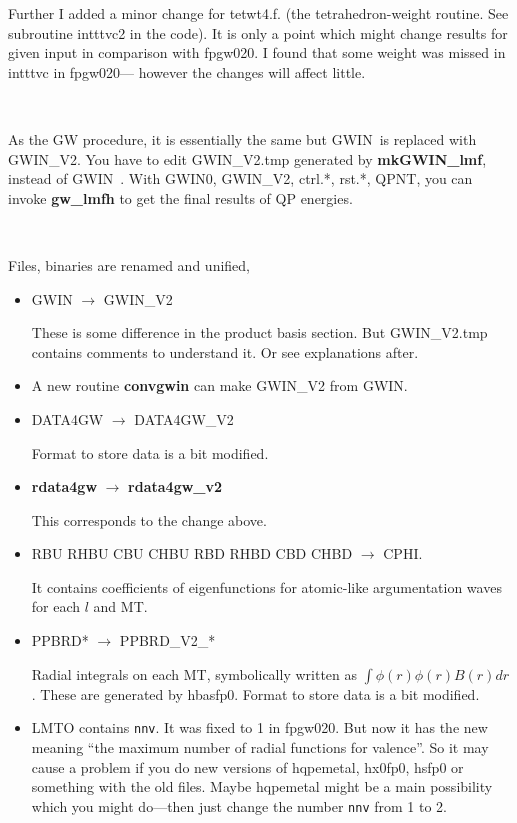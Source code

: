 \documentclass[a4paper,10pt,epsf,fleqn]{article}
\newcommand{\GWIN}{{\sf GWIN}\ }
\newcommand{\exe}[1]{{\bf #1}}
\begin{document}
{{{Further I added a minor change for tetwt4.f.
(the tetrahedron-weight routine. See subroutine intttvc2 in the code).
It is only a point which might change results for given input
in comparison with fpgw020.
I found that some weight was missed in intttvc in fpgw020---
however the changes will affect little.

\ 

As the GW procedure, it is essentially the same
but \GWIN is replaced with {\sf GWIN\_V2}.
You have to edit {\sf GWIN\_V2.tmp} generated by \exe{mkGWIN\_lmf},
instead of \GWIN. With {\sf GWIN0}, {\sf GWIN\_V2},
{\sf ctrl.*}, {\sf rst.*}, {\sf QPNT}, you can invoke \exe{gw\_lmfh}
to get the final results of QP energies.

\ 

Files, binaries are renamed and unified,

\begin{itemize}
\item
  {\sf GWIN} $\rightarrow$ {\sf GWIN\_V2}

  These is some difference in the product basis section.
  But {\sf GWIN\_V2.tmp} contains comments to understand it.
  Or see explanations after.

\item
  A new routine {\bf convgwin} can make {\sf GWIN\_V2}
  from {\sf GWIN}. 

\item
  {\sf DATA4GW} $\rightarrow$ {\sf DATA4GW\_V2}

  Format to store data is a bit modified.
\item
  {\bf rdata4gw} $\rightarrow$ {\bf rdata4gw\_v2}

   This corresponds to the change above.
\item
  {\sf RBU RHBU CBU CHBU RBD RHBD CBD CHBD } $\rightarrow$ {\sf CPHI}.

  It contains coefficients of eigenfunctions for atomic-like argumentation
  waves for each $l$ and MT.

\item
 {\sf PPBRD*} $\rightarrow$ {\sf PPBRD\_V2\_*}

 Radial integrals on each MT, symbolically written as 
  $\int \phi(r) \phi(r) B(r) dr$. 
  These are generated by {\sf hbasfp0}.
  Format to store data is a bit modified.

\item
 {\sf LMTO} contains \verb#nnv#. It was fixed to 1 in fpgw020.
 But now it has the new meaning 
 ``the maximum number of radial functions for valence''.
 So it may cause a problem if you do new versions of 
 {\sf hqpemetal, hx0fp0, hsfp0} or something with the old files.
 Maybe {\sf hqpemetal} might be a main possibility 
 which you might do---then just change the number \verb#nnv# from 1 to 2.


\end{itemize}}}}
\end{document}
